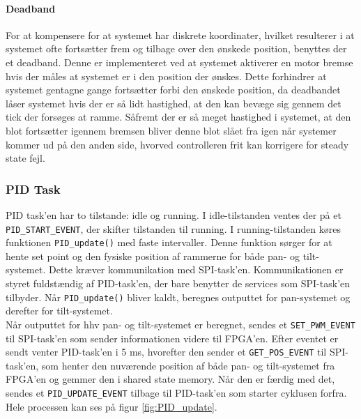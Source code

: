 \paragraph{Deadband}

For at kompensere for at systemet har diskrete koordinater, hvilket resulterer i at systemet ofte fortsætter frem og tilbage over den ønskede position, benyttes der et deadband. Denne er implementeret ved at systemet aktiverer en motor bremse hvis der måles at systemet er i den position der ønskes. Dette forhindrer at systemet gentagne gange fortsætter forbi den ønskede position, da deadbandet låser systemet hvis der er så lidt hastighed, at den kan bevæge sig gennem det tick der forsøges at ramme. Såfremt der er så meget hastighed i systemet, at den blot fortsætter igennem bremsen bliver denne blot slået fra igen når systemer kommer ud på den anden side, hvorved controlleren frit kan korrigere for steady state fejl.

\subsubsection{PID Task}

PID task'en har to tilstande: idle og running. I idle-tilstanden ventes der på et \texttt{PID\_START\_EVENT}, der skifter tilstanden til running. I running-tilstanden køres funktionen \texttt{PID\_update()} med faste intervaller. Denne funktion sørger for at hente set point og den fysiske position af rammerne for både pan- og tilt-systemet. Dette kræver kommunikation med SPI-task'en. Kommunikationen er styret fuldstændig af PID-task'en, der bare benytter de services som SPI-task'en tilbyder. Når \texttt{PID\_update()} bliver kaldt, beregnes outputtet for pan-systemet og derefter for tilt-systemet.\\
Når outputtet for hhv pan- og tilt-systemet er beregnet, sendes et \texttt{SET\_PWM\_EVENT} til SPI-task'en som sender informationen videre til FPGA'en. Efter eventet er sendt venter PID-task'en i 5 ms, hvorefter den sender et \texttt{GET\_POS\_EVENT} til SPI-task'en, som henter den nuværende position af både pan- og tilt-systemet fra FPGA'en og gemmer den i shared state memory. Når den er færdig med det, sendes et \texttt{PID\_UPDATE\_EVENT} tilbage til PID-task'en som starter cyklusen forfra. Hele processen kan ses på figur \ref{fig:PID_update}.

